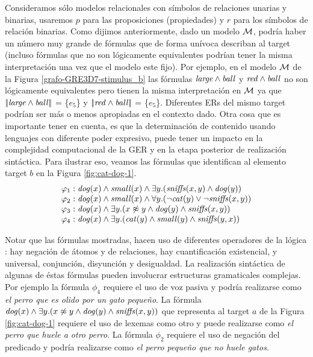 Consideramos s\'olo modelos relacionales con s\'imbolos de relaciones unarias y binarias, usaremos $p$ para las proposiciones (propiedades) y $r$ para los s\'imbolos de relaci\'on binarias.
Como dijimos anteriormente, dado un modelo $\mathcal{M}$, podr\'ia haber un n\'umero muy grande de f\'ormulas que de forma un\'ivoca
describan al target (incluso f\'ormulas que no son l\'ogicamente equivalentes podr\'ian tener
la misma interpretaci\'on una vez que el modelo este fijo). Por ejemplo, en el modelo $\mathcal{M}$ de la Figura \ref{grafo-GRE3D7-stimulus_b} las f\'ormulas $\mathit{large} \land \mathit{ball}$ y $\mathit{red} \land \mathit{ball}$ no son l\'ogicamente equivalentes pero tienen la misma interpretaci\'on en $\mathcal{M}$ ya que $|\!|\mathit{large} \land \mathit{ball}|\!|$ = \{$e_5$\} y $|\!|\mathit{red} \land \mathit{ball}|\!|$ = \{$e_5$\}. Diferentes ERs del mismo target podr\'ian ser m\'as o menos apropiadas en el contexto dado. Otra cosa que es importante tener en cuenta, es que la determinaci\'on de contenido usando lenguajes con diferente poder expresivo, puede tener un impacto en la complejidad computacional de la GER y en la etapa posterior de realizaci\'on sint\'actica. Para ilustrar eso, veamos las f\'ormulas que identifican al elemento target $b$ en la Figura \ref{fig:cat-dog-1}.
\medskip
$$
\begin{array}{ll}
 \varphi_1:  \mathit{dog}(x) \land \mathit{small}(x) \land
   \exists y . (\mathit{sniffs}(x,y) \land \mathit{dog}(y))\\
  \varphi_2:  \mathit{dog}(x) \land \mathit{small}(x) \land
  \forall y . (\neg \mathit{cat}(y) \lor \neg \mathit{sniffs}(x,y))\\
  \varphi_3:  \mathit{dog}(x) \land
  \exists y . (x \not\approx y \land \mathit{dog}(y)  \land \mathit{sniffs}(x,y))\\
  \varphi_4:  \mathit{dog}(x) \land
  \exists y . (\mathit{cat}(y) \land \mathit{small}(y) \land \mathit{sniffs}(y,x))
 \end{array}
$$

Notar que las f\'ormulas mostradas, hacen uso de diferentes operadores de la l\'ogica \FOL: hay negaci\'on de \'atomos y de relaciones, hay cuantificaci\'on existencial, y universal, conjunci\'on, disyunci\'on y desigualdad. La realizaci\'on sint\'actica de algunas de \'estas f\'ormulas pueden involucrar estructuras gramaticales complejas. Por ejemplo la f\'ormula $\phi_4$ requiere el uso de voz pasiva y podr\'ia realizarse como {\it el perro que es olido por un gato peque\~no}. La f\'ormula $\mathit{dog}(x) \land \exists y . (x \not\approx y \land \mathit{dog}(y) \land \mathit{sniffs}(x,y))$ que representa al target $a$ de la Figura \ref{fig:cat-dog-1} requiere el uso de lexemas como otro y puede realizarse como {\it el perro que huele a otro perro}. La f\'ormula $\phi_2$ requiere el uso de negaci\'on del predicado y podr\'ia realizarse como {\it el perro peque\~no que no huele gatos}.
 

